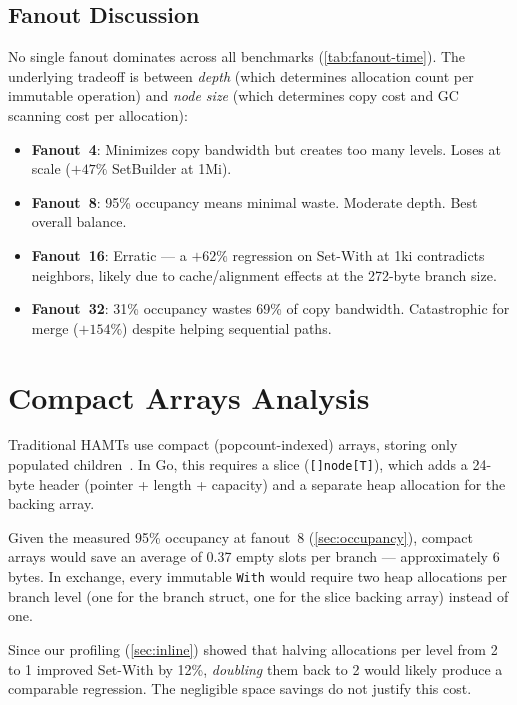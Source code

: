 \documentclass[11pt,twocolumn]{article}
\begin{document}
\subsection{Fanout Discussion}

No single fanout dominates across all benchmarks (\cref{tab:fanout-time}).
The underlying tradeoff is between \emph{depth} (which determines allocation
count per immutable operation) and \emph{node size} (which determines copy
cost and GC scanning cost per allocation):

\begin{itemize}[nosep]
  \item \textbf{Fanout~4}: Minimizes copy bandwidth but creates too many
        levels. Loses at scale ($+47\%$ SetBuilder at 1Mi).
  \item \textbf{Fanout~8}: 95\% occupancy means minimal waste. Moderate
        depth. Best overall balance.
  \item \textbf{Fanout~16}: Erratic --- a $+62\%$ regression on Set-With
        at 1ki contradicts neighbors, likely due to cache/alignment effects
        at the 272-byte branch size.
  \item \textbf{Fanout~32}: 31\% occupancy wastes 69\% of copy bandwidth.
        Catastrophic for merge ($+154\%$) despite helping sequential paths.
\end{itemize}

\section{Compact Arrays Analysis}
\label{sec:compact}

Traditional HAMTs use compact (popcount-indexed) arrays, storing only
populated children~\cite{bagwell2001,steindorfer2015}.
In Go, this requires a slice (\texttt{[]node[T]}), which adds a 24-byte
header (pointer + length + capacity) and a separate heap allocation for the
backing array.

Given the measured 95\% occupancy at fanout~8 (\cref{sec:occupancy}),
compact arrays would save an average of 0.37 empty slots per branch ---
approximately 6 bytes.
In exchange, every immutable \texttt{With} would require two heap
allocations per branch level (one for the branch struct, one for the slice
backing array) instead of one.

Since our profiling (\cref{sec:inline}) showed that halving allocations per
level from 2 to 1 improved Set-With by 12\%, \emph{doubling} them back to 2
would likely produce a comparable regression.
The negligible space savings do not justify this cost.
\end{document}
